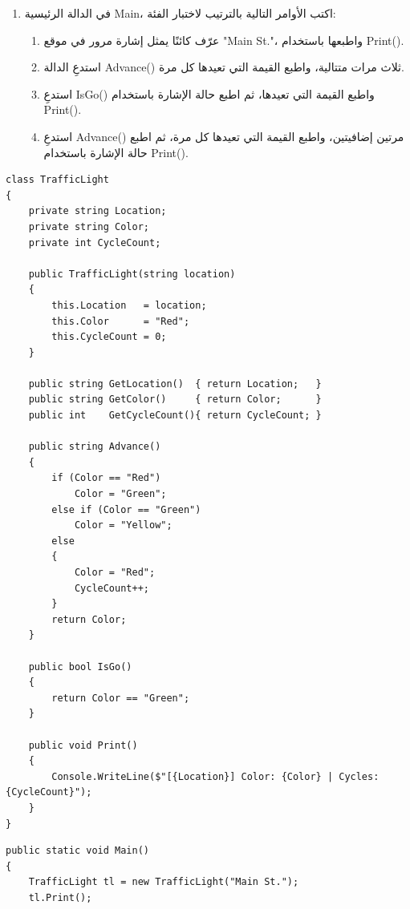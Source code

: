 \documentclass[14pt]{extarticle}
\begin{document}
\begin{enumerate}[itemsep=2em]
\begin{enumerate}[itemsep=1em]
    \item في الدالة الرئيسية \textenglish{Main}، اكتب الأوامر التالية بالترتيب لاختبار الفئة:
    \begin{enumerate}[itemsep=1pt, label=(\roman*)]
        \item عرّف كائنًا يمثل إشارة مرور في موقع \textenglish{"Main St."}، واطبعها باستخدام \textenglish{Print()}.
        \item استدعِ الدالة \textenglish{Advance()} ثلاث مرات متتالية، واطبع القيمة التي تعيدها كل مرة.
        \item استدعِ \textenglish{IsGo()} واطبع القيمة التي تعيدها، ثم اطبع حالة الإشارة باستخدام \textenglish{Print()}.
        \item استدعِ \textenglish{Advance()} مرتين إضافيتين، واطبع القيمة التي تعيدها كل مرة، ثم اطبع حالة الإشارة باستخدام \textenglish{Print()}.
    \end{enumerate}
\end{enumerate}

\ifwithsols
{\small
\begin{boxSolution}
\begin{english}
\begin{verbatim}
class TrafficLight
{
    private string Location;
    private string Color;
    private int CycleCount;

    public TrafficLight(string location)
    {
        this.Location   = location;
        this.Color      = "Red";
        this.CycleCount = 0;
    }

    public string GetLocation()  { return Location;   }
    public string GetColor()     { return Color;      }
    public int    GetCycleCount(){ return CycleCount; }

    public string Advance()
    {
        if (Color == "Red")
            Color = "Green";
        else if (Color == "Green")
            Color = "Yellow";
        else
        {
            Color = "Red";
            CycleCount++;
        }
        return Color;
    }

    public bool IsGo()
    {
        return Color == "Green";
    }

    public void Print()
    {
        Console.WriteLine($"[{Location}] Color: {Color} | Cycles: {CycleCount}");
    }
}
\end{verbatim}
\end{english}
\end{boxSolution}
\begin{boxSolution}
\begin{english}
\begin{verbatim}
public static void Main()
{
    TrafficLight tl = new TrafficLight("Main St.");
    tl.Print();


\end{verbatim}
\end{english}
\end{boxSolution}}
\end{enumerate}
\end{document}
